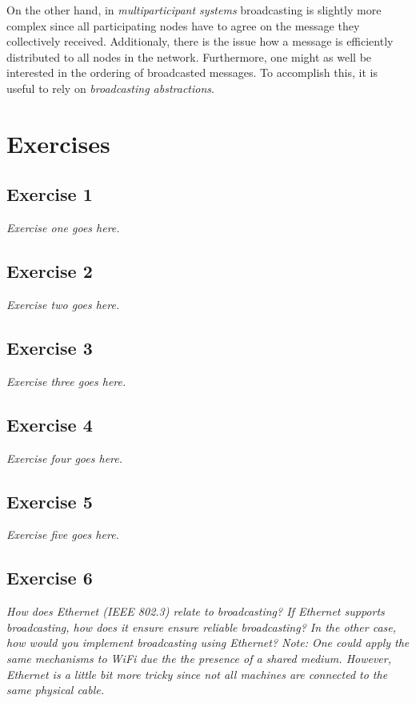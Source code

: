 On the other hand, in \emph{multiparticipant systems} broadcasting is slightly more complex since all participating nodes have to agree on the message they collectively received. Additionaly, there is the issue how a message is efficiently distributed to all nodes in the network. Furthermore, one might as well be interested in the ordering of broadcasted messages. To accomplish this, it is useful to rely on \emph{broadcasting abstractions}.

\section{Exercises}
\label{sec:exercises}

\subsection*{Exercise 1}
\label{sec:exercise_1}

\emph{Exercise one goes here.}

\subsection*{Exercise 2}
\label{sec:exercise_2}

\emph{Exercise two goes here.}

\subsection*{Exercise 3}
\label{sec:exercise_3}

\emph{Exercise three goes here.}

\subsection*{Exercise 4}
\label{sec:exercise_4}

\emph{Exercise four goes here.}

\subsection*{Exercise 5}
\label{sec:exercise_5}

\emph{Exercise five goes here.}

\subsection*{Exercise 6}
\label{sec:exercise_6}

\emph{How does Ethernet (IEEE 802.3) relate to broadcasting? If Ethernet supports broadcasting, how does it ensure ensure reliable broadcasting? In the other case, how would you implement broadcasting using Ethernet? Note: One could apply the same mechanisms to WiFi due the the presence of a shared medium. However, Ethernet is a little bit more tricky since not all machines are connected to the same physical cable.}


